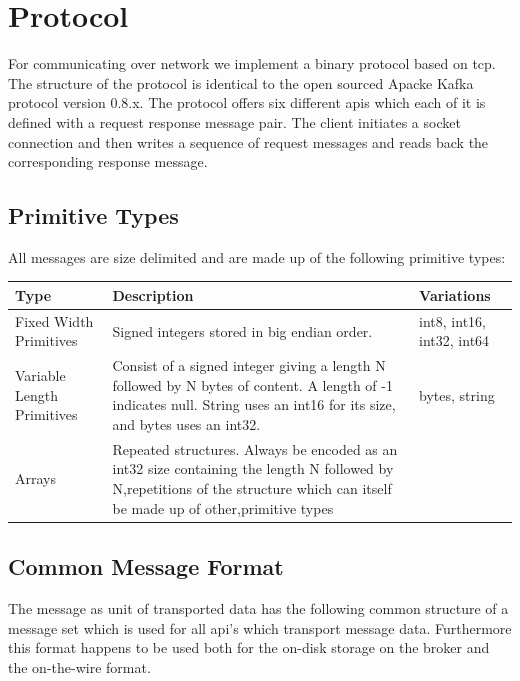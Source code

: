\section{Protocol}
\label{sec-protocol}
For communicating over network we implement a binary protocol based on tcp. The
structure of the protocol is identical to the open sourced Apacke Kafka protocol
version 0.8.x. The protocol offers six different apis which each of it is
defined with a request response message pair. The client initiates a socket connection and then
writes a sequence of request messages and reads back the corresponding response
message. 

\subsection{Primitive Types}
All messages are size delimited and are made up of the following primitive
types: 

\begin{table}[h]
\begin{tabular}{| p{3cm}| p{7cm} | l |}
\hline
\textbf{Type} & \textbf{Description} & \textbf{Variations} \\ \hline
Fixed Width Primitives     & Signed integers stored in big endian order.                                                                                                                                     & int8, int16, int32, int64 \\ \hline
Variable Length Primitives & Consist of a signed integer giving a length N followed by N bytes of content. A length of -1 indicates null. String uses an int16 for its size, and bytes uses an int32.        & bytes, string             \\ \hline
Arrays                     & Repeated structures. Always be encoded as an int32 size containing the length N followed by N,repetitions of the structure which can itself be made up of other,primitive types &                           \\ \hline
\end{tabular}
\end{table}

\subsection{Common Message Format}
The message as unit of transported data has the following common structure of a
message set which is used for all api's which transport message data.
Furthermore this format happens to be used both for the on-disk storage on the
broker and the on-the-wire format.

